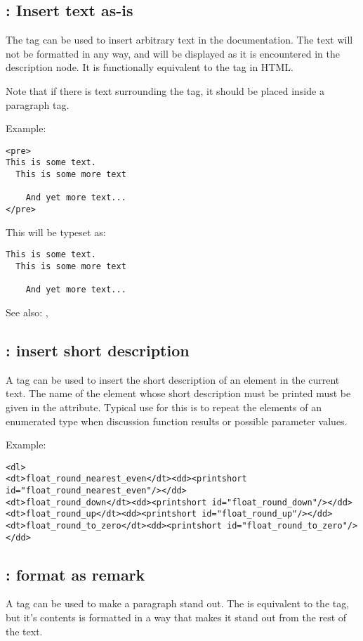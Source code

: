 \subsection{ : Insert text as-is}
\label{tag:pre}
The  tag can be used to insert arbitrary text in the documentation.
The text will not be formatted in any way, and will be displayed as it is
encountered in the description node. It is functionally equivalent to the
 tag in HTML.

Note that if there is text surrounding the  tag, it should be placed
inside a  paragraph tag.

Example:
\begin{verbatim}
<pre>
This is some text.
  This is some more text

    And yet more text...
</pre>
\end{verbatim}
This will be typeset as:
\begin{verbatim}
This is some text.
  This is some more text

    And yet more text...
\end{verbatim}

See also: , 

\subsection{ : insert short description}
\label{tag:printshort}
A  tag can be used to insert the short description of an 
element in the current text. The name of the element whose short description
must be printed must be given in the  attribute. Typical use for
this is to repeat the elements of an enumerated type when discussion
function results or possible parameter values.

Example:
\begin{verbatim}
<dl>
<dt>float_round_nearest_even</dt><dd><printshort id="float_round_nearest_even"/></dd>
<dt>float_round_down</dt><dd><printshort id="float_round_down"/></dd>
<dt>float_round_up</dt><dd><printshort id="float_round_up"/></dd>
<dt>float_round_to_zero</dt><dd><printshort id="float_round_to_zero"/></dd>
\end{verbatim}

\subsection{ : format as remark}
\label{tag:remark}
A  tag can be used to make a paragraph stand out. The
 is equivalent to the  tag, but it's contents is
formatted in a way that makes it stand out from the rest of the text.

